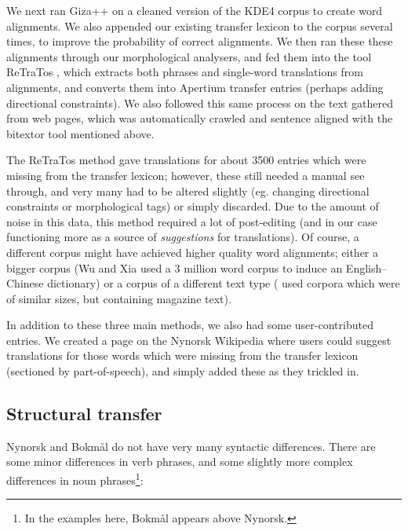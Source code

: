 \documentclass[11pt]{article}
\begin{document}
We next ran Giza++ \citep{och2003scv} on a cleaned version of the KDE4
corpus to create word alignments. We also appended our existing
transfer lexicon to the corpus several times, to improve the
probability of correct alignments. We then ran these these alignments
through our morphological analysers, and fed them into the tool
ReTraTos \citep{caseli2006aib}, which extracts both phrases and
single-word translations from alignments, and converts them into
Apertium transfer entries (perhaps adding directional constraints). We
also followed this same process on the text gathered from web pages,
which was automatically crawled and sentence aligned with the bitextor
tool mentioned above.

The ReTraTos method gave translations for about 3500 entries which
were missing from the transfer lexicon; however, these still needed a
manual see through, and very many had to be altered slightly (eg.
changing directional constraints or morphological tags) or simply
discarded. Due to the amount of noise in this data, this method
required a lot of post-editing (and in our case functioning more as a
source of \emph{suggestions} for translations). Of course, a different
corpus might have achieved higher quality word alignments; either a
bigger corpus (Wu and Xia \citep[1994, in][p.~230]{caseli2006aib} used
a 3 million word corpus to induce an English–Chinese dictionary) or a
corpus of a different text type (\citet{caseli2006aib} used corpora
which were of similar sizes, but containing magazine text).

In addition to these three main methods, we also had some
user-contributed entries. We created a page on the Nynorsk Wikipedia
where users could suggest translations for those words which were
missing from the transfer lexicon (sectioned by part-of-speech), and
simply added these as they trickled in.


\subsection{Structural transfer}

Nynorsk and Bokmål do not have very many syntactic differences. There
are some minor differences in verb phrases, and some slightly more
complex differences in noun phrases\footnote{In the examples here,
  Bokmål appears above Nynorsk.}:
\end{document}
